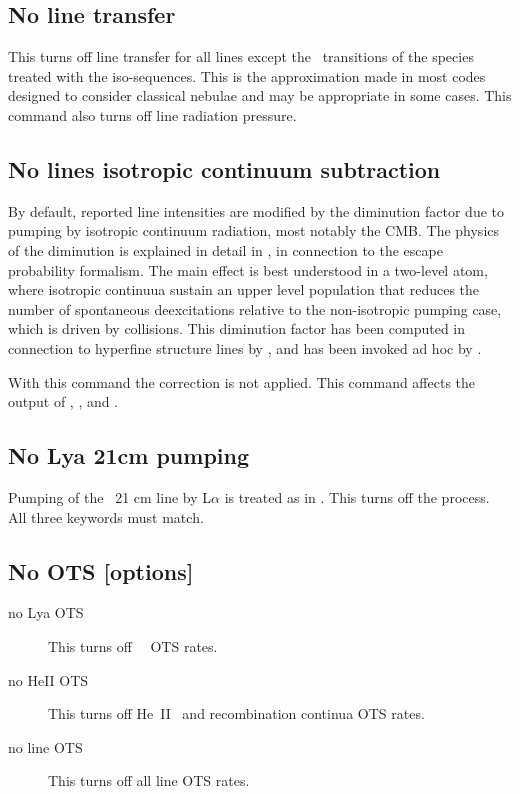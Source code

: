 \subsection{No line transfer}

This turns off line transfer for all lines except the
\la\ transitions
of the species treated with the iso-sequences.
This is the approximation
made in most codes designed to consider classical nebulae and may be
appropriate in some cases.
This command also turns off line radiation pressure.


\subsection{No lines isotropic continuum subtraction}
\label{sec:no-lines-isotropic-continuum-subtraction}

By default, reported line intensities are modified by the diminution factor
due to pumping by isotropic continuum radiation, most notably the CMB.
The physics of the diminution is explained in detail in \citet{Chatzikos2013},
in connection to the escape probability formalism.
The main effect is best understood in a two-level atom, where isotropic
continuua sustain an upper level population that reduces the number of
spontaneous deexcitations relative to the non-isotropic pumping case,
which is driven by collisions.
This diminution factor has been computed in connection to hyperfine structure
lines by \citet{DCruz1998}, and has been invoked ad hoc by \citet{Goldreich1974}.

\par
With this command the correction is not applied.
This command affects the output of
,
,
and .


\subsection{No Lya 21cm pumping}

Pumping of the \hi\ 21 cm line by L$\alpha $ is treated
as in \citet{Deguchi1985}.
This turns off the process.
All three keywords must match.

\subsection{No OTS [options]}
\begin{description}
\item[no Lya OTS]  This turns off \hi\ \la\ OTS rates.

\item[no HeII OTS]  This turns off He~II \la\ and recombination continua OTS rates.

\item[no line OTS]  This turns off all line OTS rates.
\end{description}

